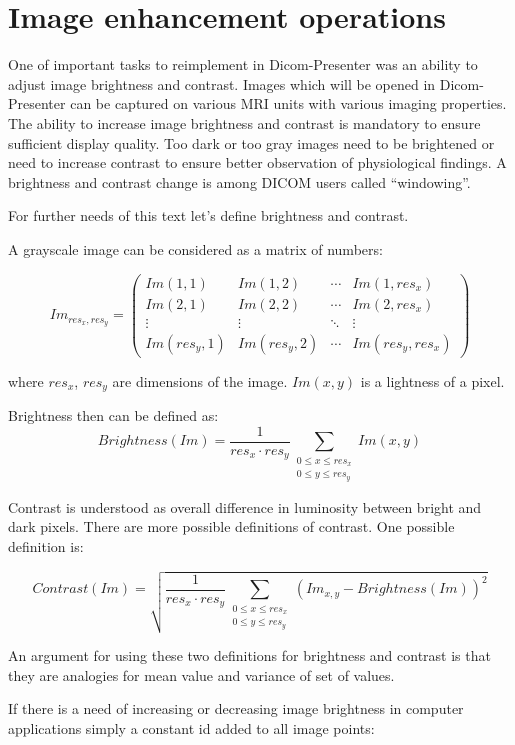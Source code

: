 \section{Image enhancement operations}

One of important tasks to reimplement in Dicom-Presenter was an ability to adjust image brightness and contrast. Images which will be opened in Dicom-Presenter can be captured on various MRI units with various imaging properties. The ability to increase image brightness and contrast is mandatory to ensure sufficient display quality. Too dark or too gray images need to be brightened or need to increase contrast to ensure better observation of physiological findings. A brightness and contrast change is among DICOM users called ``windowing''.

For further needs of this text let's define brightness and contrast. 

A grayscale image can be considered as a matrix of numbers: 

\[
 Im_{res_{x},res_{y}} =
 \begin{pmatrix}
  Im(1,1) & Im(1,2) & \cdots & Im(1,res_{x}) \\
  Im(2,1) & Im(2,2) & \cdots & Im(2,res_{x}) \\
  \vdots  & \vdots  & \ddots & \vdots  \\
  Im(res_{y},1) & Im(res_{y},2) & \cdots & Im(res_{y},res_{x})
 \end{pmatrix}
\]

where $ res_{x} $, $res_{y}$ are dimensions of the image. $Im(x,y)$ is a lightness of a pixel.

Brightness then can be defined as:
\[
  Brightness(Im) = \frac{1}{res_{x}  \cdot res_{y}}\sum_{\substack{0 \leq x \leq res_{x} \\ 0 \leq y \leq res_{y}}} Im(x,y)
\]

Contrast is understood as overall difference in luminosity between bright and dark pixels. There are more possible definitions of contrast. One possible definition is:

\[
Contrast(Im) = \sqrt{\frac{1}{res_{x} \cdot res_{y}}\sum_{\substack{ 0 \leq x \leq res_{x} \\ 0 \leq y \leq res_{y} }}(Im_{x,y}-Brightness(Im))^2}
\]

An argument for using these two definitions for brightness and contrast is that they are analogies for mean value and variance of set of values.

If there is a need of increasing or decreasing image brightness in computer applications simply a constant id added to all image points:

